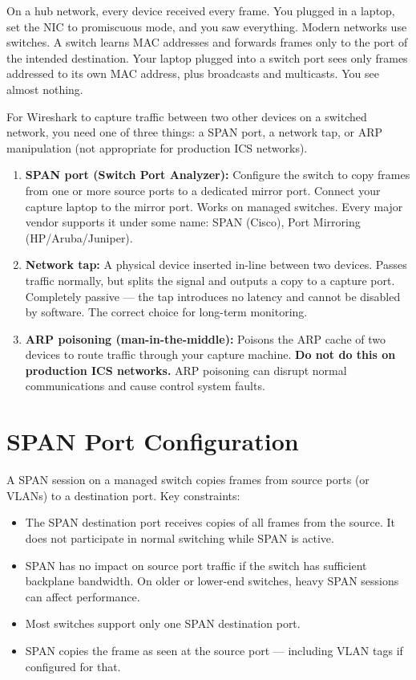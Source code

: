 \documentclass[12pt,twoside,openright]{memoir}
\begin{document}
On a hub network, every device received every frame. You plugged in a laptop, set the NIC to promiscuous mode, and you saw everything. Modern networks use switches. A switch learns MAC addresses and forwards frames only to the port of the intended destination. Your laptop plugged into a switch port sees only frames addressed to its own MAC address, plus broadcasts and multicasts. You see almost nothing.

For Wireshark to capture traffic between two other devices on a switched network, you need one of three things: a SPAN port, a network tap, or ARP manipulation (not appropriate for production ICS networks).

\begin{keyconcept}[title={Three Ways to Capture on a Switched Network}]
\begin{enumerate}[noitemsep]
  \item \textbf{SPAN port (Switch Port Analyzer):} Configure the switch to copy frames from one or more source ports to a dedicated mirror port. Connect your capture laptop to the mirror port. Works on managed switches. Every major vendor supports it under some name: SPAN (Cisco), Port Mirroring (HP/Aruba/Juniper).
  \item \textbf{Network tap:} A physical device inserted in-line between two devices. Passes traffic normally, but splits the signal and outputs a copy to a capture port. Completely passive --- the tap introduces no latency and cannot be disabled by software. The correct choice for long-term monitoring.
  \item \textbf{ARP poisoning (man-in-the-middle):} Poisons the ARP cache of two devices to route traffic through your capture machine. \textbf{Do not do this on production ICS networks.} ARP poisoning can disrupt normal communications and cause control system faults.
\end{enumerate}
\end{keyconcept}

\section{SPAN Port Configuration}

A SPAN session on a managed switch copies frames from source ports (or VLANs) to a destination port. Key constraints:
\begin{itemize}[noitemsep]
  \item The SPAN destination port receives copies of all frames from the source. It does not participate in normal switching while SPAN is active.
  \item SPAN has no impact on source port traffic if the switch has sufficient backplane bandwidth. On older or lower-end switches, heavy SPAN sessions can affect performance.
  \item Most switches support only one SPAN destination port.
  \item SPAN copies the frame as seen at the source port --- including VLAN tags if configured for that.
\end{itemize}
\end{document}
